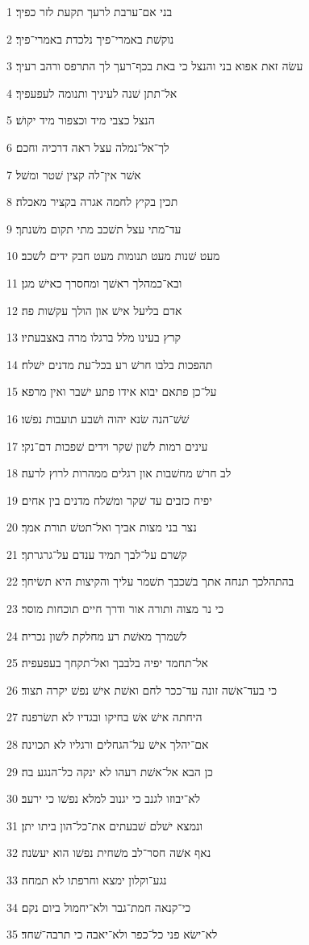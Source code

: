 \par 1 בני אם־ערבת לרעך תקעת לזר כפיך׃
\par 2 נוקשׁת באמרי־פיך נלכדת באמרי־פיך׃
\par 3 עשׂה זאת אפוא בני והנצל כי באת בכף־רעך לך התרפס ורהב רעיך׃
\par 4 אל־תתן שׁנה לעיניך ותנומה לעפעפיך׃
\par 5 הנצל כצבי מיד וכצפור מיד יקושׁ׃
\par 6 לך־אל־נמלה עצל ראה דרכיה וחכם׃
\par 7 אשׁר אין־לה קצין שׁטר ומשׁל׃
\par 8 תכין בקיץ לחמה אגרה בקציר מאכלה׃
\par 9 עד־מתי עצל תשׁכב מתי תקום משׁנתך׃
\par 10 מעט שׁנות מעט תנומות מעט חבק ידים לשׁכב׃
\par 11 ובא־כמהלך ראשׁך ומחסרך כאישׁ מגן׃
\par 12 אדם בליעל אישׁ און הולך עקשׁות פה׃
\par 13 קרץ בעינו מלל ברגלו מרה באצבעתיו׃
\par 14 תהפכות בלבו חרשׁ רע בכל־עת מדנים ישׁלח׃
\par 15 על־כן פתאם יבוא אידו פתע ישׁבר ואין מרפא׃
\par 16 שׁשׁ־הנה שׂנא יהוה ושׁבע תועבות נפשׁו׃
\par 17 עינים רמות לשׁון שׁקר וידים שׁפכות דם־נקי׃
\par 18 לב חרשׁ מחשׁבות און רגלים ממהרות לרוץ לרעה׃
\par 19 יפיח כזבים עד שׁקר ומשׁלח מדנים בין אחים׃
\par 20 נצר בני מצות אביך ואל־תטשׁ תורת אמך׃
\par 21 קשׁרם על־לבך תמיד ענדם על־גרגרתך׃
\par 22 בהתהלכך תנחה אתך בשׁכבך תשׁמר עליך והקיצות היא תשׂיחך׃
\par 23 כי נר מצוה ותורה אור ודרך חיים תוכחות מוסר׃
\par 24 לשׁמרך מאשׁת רע מחלקת לשׁון נכריה׃
\par 25 אל־תחמד יפיה בלבבך ואל־תקחך בעפעפיה׃
\par 26 כי בעד־אשׁה זונה עד־ככר לחם ואשׁת אישׁ נפשׁ יקרה תצוד׃
\par 27 היחתה אישׁ אשׁ בחיקו ובגדיו לא תשׂרפנה׃
\par 28 אם־יהלך אישׁ על־הגחלים ורגליו לא תכוינה׃
\par 29 כן הבא אל־אשׁת רעהו לא ינקה כל־הנגע בה׃
\par 30 לא־יבוזו לגנב כי יגנוב למלא נפשׁו כי ירעב׃
\par 31 ונמצא ישׁלם שׁבעתים את־כל־הון ביתו יתן׃
\par 32 נאף אשׁה חסר־לב משׁחית נפשׁו הוא יעשׂנה׃
\par 33 נגע־וקלון ימצא וחרפתו לא תמחה׃
\par 34 כי־קנאה חמת־גבר ולא־יחמול ביום נקם׃
\par 35 לא־ישׂא פני כל־כפר ולא־יאבה כי תרבה־שׁחד׃

